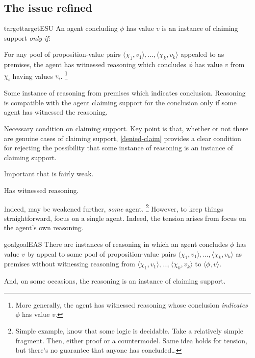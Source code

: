 \subsection{The issue refined}
\label{sec:issue-refined}

\begin{note}
  \begin{restatable}{target}{targetESU}
    \label{denied-claim}
    An agent concluding \(\phi\) has value \(v\) is an instance of claiming support \emph{only if}:

    For any pool of proposition-value pairs \(\langle \chi_{1},v_{1} \rangle,\dots,\langle \chi_{k},v_{k} \rangle\) appealed to as premises, the agent has witnessed reasoning which concludes \(\phi\) has value \(v\) from \(\chi_{i}\) having values \(v_{i}\).\nolinebreak
    \footnote{More generally, the agent has witnessed reasoning whose conclusion \emph{indicates} \(\phi\) has value \(v\).}
  \end{restatable}


  Some instance of reasoning from premises which indicates conclusion.
  Reasoning is compatible with the agent claiming support for the conclusion only if some agent has witnessed the reasoning.

  Necessary condition on claiming support.
  Key point is that, whether or not there are genuine cases of claiming support, \autoref{denied-claim} provides a clear condition for rejecting the possibility that some instance of reasoning is an instance of claiming support.
\end{note}

\begin{note}
  Important that \ESU{} is fairly weak.

  Has witnessed reasoning.

  Indeed, \ESU{} may be weakened further, \emph{some} agent.\nolinebreak
  \footnote{
    Simple example, know that some logic is decidable.
    Take a relatively simple fragment.
    Then, either proof or a countermodel.
    Same idea holds for tension, but there's no guarantee that anyone has concluded\dots
  }
  However, to keep things straightforward, focus on a single agent.
  Indeed, the tension arises from focus on the agent's own reasoning.
\end{note}

\begin{note}
  \begin{restatable}{goal}{goalEAS}
    \label{prop:EAS}
    There are instances of reasoning in which an agent concludes \(\phi\) has value \(v\) by appeal to some pool of proposition-value pairs \(\langle \chi_{1},v_{1} \rangle,\dots,\langle \chi_{k},v_{k} \rangle\) as premises without witnessing reasoning from \(\langle \chi_{1},v_{1} \rangle,\dots,\langle \chi_{k},v_{k} \rangle\) to \(\langle \phi,v \rangle\).

    And, on some occasions, the reasoning is an instance of claiming support.
  \end{restatable}
\end{note}

